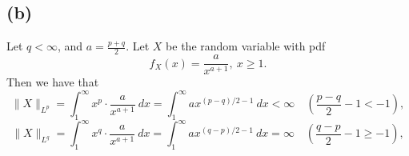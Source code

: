 \documentclass{article}
\begin{document}
\subsection*{(b)}
Let $q < \infty$, and $a = \frac{p + q}{2}$. Let $X$ be the random variable with pdf 
\[ f_X(x) = \frac{a}{x^{a + 1}}, \ x \geq 1. \]
Then we have that 
\[ \|X\|_{L^p} = \int_{1}^{\infty} x^p \cdot \frac{a}{x^{a + 1}} \ dx 
= \int_{1}^{\infty} ax^{(p - q) / 2 - 1} \ dx < \infty \quad (\frac{p - q}{2} - 1 < -1), \]
\[ \|X\|_{L^q} = \int_{1}^{\infty} x^q \cdot \frac{a}{x^{a + 1}} \ dx 
= \int_{1}^{\infty} ax^{(q - p) / 2 - 1} \ dx = \infty \quad (\frac{q - p}{2} - 1 \geq -1), \]
\end{document}
